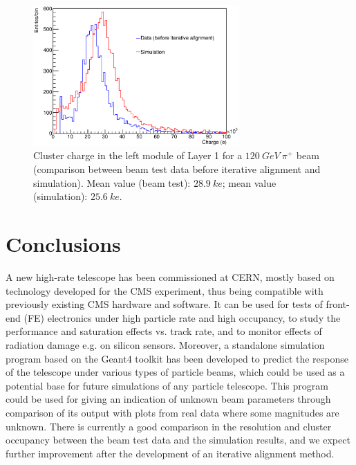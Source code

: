 \documentclass[a4paper,11pt]{article}
\begin{document}
\begin{figure}[htbp]
	\centering %
	\includegraphics[width=0.7\textwidth,origin=c,angle=0]{cluster_charge_comparison.eps}
	\caption{\label{fig:9} Cluster charge in the left module of Layer 1 for a $120\: GeV\: \pi^{+}$ beam (comparison between beam test data before iterative alignment and simulation). \newline Mean value (beam test): $28.9\: ke$; mean value (simulation): $25.6\: ke$.}
\end{figure}

\section{Conclusions}
A new high-rate telescope has been commissioned at CERN, mostly based on technology developed for the CMS experiment, thus being compatible with previously existing CMS hardware and software. It can be used for tests of front-end (FE) electronics under high particle rate and high occupancy, to study the performance and saturation effects vs. track rate, and to monitor effects of radiation damage e.g. on silicon sensors. Moreover, a standalone simulation program based on the Geant4 toolkit has been developed to predict the response of the telescope under various types of particle beams, which could be used as a potential base for future simulations of any particle telescope. This program could be used for giving an indication of unknown beam parameters through comparison of its output with plots from real data where some magnitudes are unknown. There is currently a good comparison in the resolution and cluster occupancy between the beam test data and the simulation results, and we expect further improvement after the development of an iterative alignment method.
\end{document}
